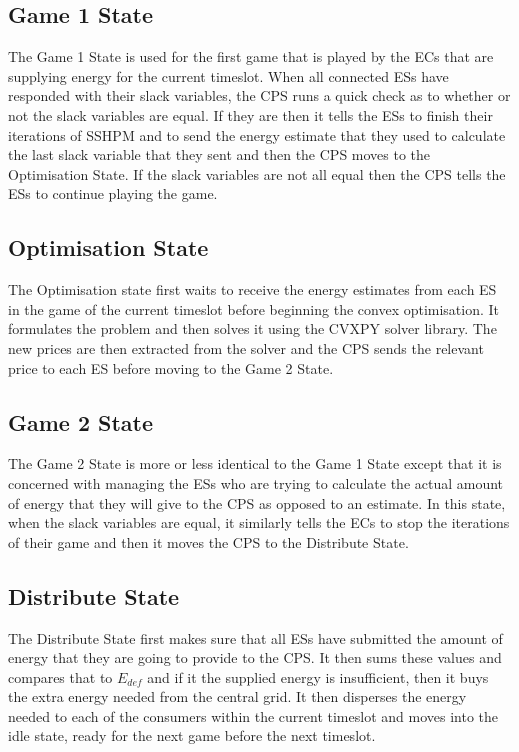 \documentclass[a4paper, notitlepage]{report}
\begin{document}
\subsection{Game 1 State}
\label{sec:orgff8fcf8}
The Game 1 State is used for the first game that is played by the ECs that are
supplying energy for the current timeslot. When all connected ESs have responded
with their slack variables, the CPS runs a quick check as to whether or not the
slack variables are equal. If they are then it tells the ESs to finish their
iterations of SSHPM and to send the energy estimate that they used to calculate
the last slack variable that they sent and then the CPS moves to the
Optimisation State. If the slack variables are not all equal then the CPS tells
the ESs to continue playing the game.
\subsection{Optimisation State}
\label{sec:org0fb200e}
The Optimisation state first waits to receive the energy estimates from each ES
in the game of the current timeslot before beginning the convex optimisation. It
formulates the problem and then solves it using the CVXPY \cite{diamond2016cvxpy}
solver library. The new prices are then extracted from the solver and the CPS
sends the relevant price to each ES before moving to the Game 2 State.
\subsection{Game 2 State}
\label{sec:org382c5d0}
The Game 2 State is more or less identical to the Game 1 State except that it is
concerned with managing the ESs who are trying to calculate the actual amount of
energy that they will give to the CPS as opposed to an estimate. In this state,
when the slack variables are equal, it similarly tells the ECs to stop the
iterations of their game and then it moves the CPS to the Distribute State.
\subsection{Distribute State}
\label{sec:org9a29fd1}
The Distribute State first makes sure that all ESs have submitted the amount of
energy that they are going to provide to the CPS. It then sums these values and
compares that to \(E_{def}\) and if it the supplied energy is insufficient, then it
buys the extra energy needed from the central grid. It then disperses the energy
needed to each of the consumers within the current timeslot and moves into the
idle state, ready for the next game before the next timeslot.
\end{document}
